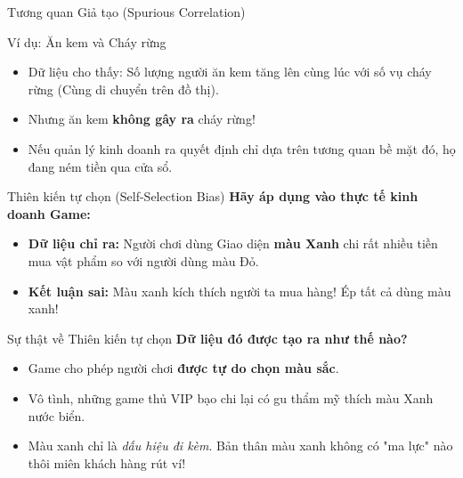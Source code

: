 \documentclass[aspectratio=169]{beamer}
\begin{document}
\begin{frame}{Tương quan Giả tạo (Spurious Correlation)}
    \begin{alertblock}{Ví dụ: Ăn kem và Cháy rừng}
        \begin{itemize}
            \item Dữ liệu cho thấy: Số lượng người ăn kem tăng lên cùng lúc với số vụ cháy rừng (Cùng di chuyển trên đồ thị).
            \item Nhưng ăn kem \textbf{không gây ra} cháy rừng!
            \item Nếu quản lý kinh doanh ra quyết định chỉ dựa trên tương quan bề mặt đó, họ đang ném tiền qua cửa sổ.
        \end{itemize}
    \end{alertblock}
\end{frame}

\begin{frame}{Thiên kiến tự chọn (Self-Selection Bias)}
    \textbf{Hãy áp dụng vào thực tế kinh doanh Game:}
    \begin{itemize}
        \item \textbf{Dữ liệu chỉ ra:} Người chơi dùng Giao diện \textbf{màu Xanh} chi rất nhiều tiền mua vật phẩm so với người dùng màu Đỏ.
        \item \textbf{Kết luận sai:} Màu xanh kích thích người ta mua hàng! Ép tất cả dùng màu xanh!
    \end{itemize}
\end{frame}

\begin{frame}{Sự thật về Thiên kiến tự chọn}
    \textbf{Dữ liệu đó được tạo ra như thế nào?}
    \begin{itemize}
        \item Game cho phép người chơi \textbf{được tự do chọn màu sắc}.
        \item Vô tình, những game thủ VIP bạo chi lại có gu thẩm mỹ thích màu Xanh nước biển.
        \item Màu xanh chỉ là \textit{dấu hiệu đi kèm}. Bản thân màu xanh không có "ma lực" nào thôi miên khách hàng rút ví!
    \end{itemize}
\end{frame}
\end{document}
